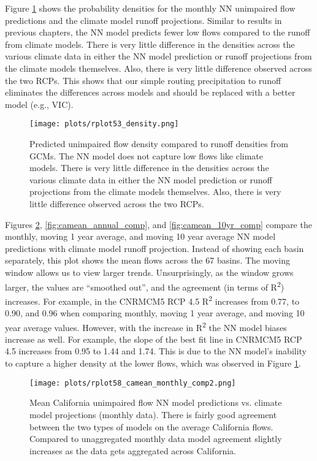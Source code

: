 Figure \ref{fig:density} shows the probability densities for the monthly NN unimpaired flow predictions and the climate model runoff projections. Similar to results in previous chapters, the NN model predicts fewer low flows compared to the runoff from climate models. There is very little difference in the densities across the various climate data in either the NN model prediction or runoff projections from the climate models themselves. Also, there is very little difference observed across the two RCPs. This shows that our simple routing precipitation to runoff eliminates the differences across models and should be replaced with a better model (e.g., VIC). 

\begin{figure}
	\centering
	\texttt{[image: plots/rplot53\_density.png]}
	\caption[Predicted unimpaired flow density compared to runoff densities from GCMs.]{Predicted unimpaired flow density compared to runoff densities from GCMs. The NN model does not capture low flows like climate models. There is very little difference in the densities across the various climate data in either the NN model prediction or runoff projections from the climate models themselves. Also, there is very little difference observed across the two RCPs.} 
	\label{fig:density}
\end{figure}

Figures \ref{fig:camean_monthly_comp}, \ref{fig:camean_annual_comp}, and \ref{fig:camean_10yr_comp} compare the monthly, moving 1 year average, and moving 10 year average NN model predictions with climate model runoff projection. Instead of showing each basin separately, this plot shows the mean flows across the 67 basins. The moving window allows us to view larger trends. Unsurprisingly, as the window grows larger, the values are ``smoothed out'', and the agreement (in terms of R\textsuperscript{2}) increases. For example, in the CNRMCM5 RCP 4.5 R\textsuperscript{2} increases from 0.77, to 0.90, and 0.96 when comparing monthly, moving 1 year average, and moving 10 year average values. However, with the increase in R\textsuperscript{2} the NN model biases increase as well. For example, the slope of the best fit line in CNRMCM5 RCP 4.5 increases from 0.95 to 1.44 and 1.74. This is due to the NN model's inability to capture a higher density at the lower flows, which was observed in Figure \ref{fig:density}.

\begin{figure}
	\centering
	\texttt{[image: plots/rplot58\_camean\_monthly\_comp2.png]}
	\caption[Mean California unimpaired flow NN model predictions vs. climate model projections (monthly data).]{Mean California unimpaired flow NN model predictions vs. climate model projections (monthly data). There is fairly good agreement between the two types of models on the average California flows. Compared to unaggregated monthly data model agreement slightly increases as the data gets aggregated across California.} 
	\label{fig:camean_monthly_comp}
\end{figure}

